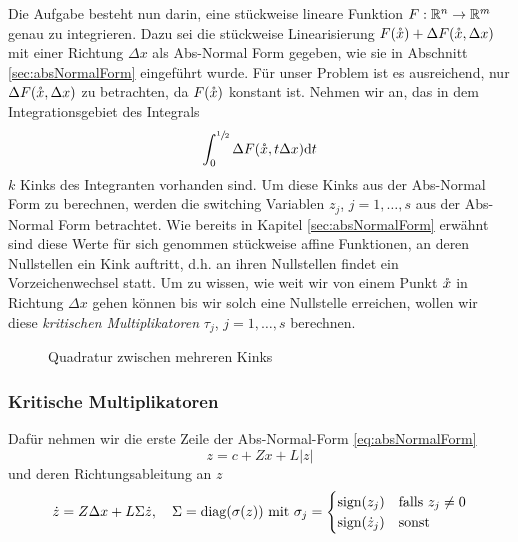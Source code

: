 Die Aufgabe besteht nun darin, eine stückweise lineare Funktion $F:\mathbb{R}^n \to \mathbb{R}^m$ genau zu integrieren. Dazu sei die stückweise Linearisierung $F(\mathring{x}) + \Delta F(\mathring{x},\Delta x)$ mit einer Richtung $\Delta x$ als Abs-Normal Form gegeben, wie sie in Abschnitt \ref{sec:absNormalForm} eingeführt wurde. 
Für unser Problem ist es ausreichend, nur $\Delta F(\mathring{x},\Delta x)$ zu betrachten, da $F(\mathring{x})$ konstant ist.
Nehmen wir an, das in dem Integrationsgebiet des Integrals
\begin{equation}
\label{eq:quadInitialProblem}
 \int_0^{\sfrac{1}{2}} \Delta F(\mathring{x},t\Delta x) \text{d}t
\end{equation}
$k$ Kinks des Integranten vorhanden sind. 
Um diese Kinks aus der Abs-Normal Form zu berechnen, werden die switching Variablen $z_j$, $j=1,\dots,s$ aus der Abs-Normal Form betrachtet. Wie bereits in Kapitel \ref{sec:absNormalForm} erwähnt sind diese Werte für sich genommen stückweise affine Funktionen, an deren Nullstellen ein Kink auftritt,
d.h. an ihren Nullstellen findet ein Vorzeichenwechsel statt. Um zu wissen, wie weit wir von einem Punkt $\mathring{x}$ in Richtung $\Delta x$ gehen können bis wir solch eine Nullstelle erreichen, wollen wir diese \textit{kritischen Multiplikatoren} $\tau_j$, $j=1,\ldots, s$ berechnen. 
\begin{figure}[H]
\centering
 
 \caption{Quadratur zwischen mehreren Kinks}
\label{fig:quadrature} 
\end{figure}
\subsubsection{Kritische Multiplikatoren}
Dafür nehmen wir die erste Zeile der Abs-Normal-Form \eqref{eq:absNormalForm}
\begin{equation}
\label{eq:absNormalZ}
 z = c+Zx + L|z|
\end{equation}
und deren Richtungsableitung an $z$
\begin{equation}
\label{eq:absNormalZDerivative}
 \dot z = Z\Delta x + L\Sigma \dot z, \quad
 \Sigma  = \operatorname{diag}(\sigma(z)) ~ \text{mit } \sigma_j =  \begin{cases}
            \text{sign}(z_j) & \text{falls } z_j\neq 0\\
            \text{sign}(\dot z_j) &  \text{sonst}
           \end{cases}
\end{equation}

